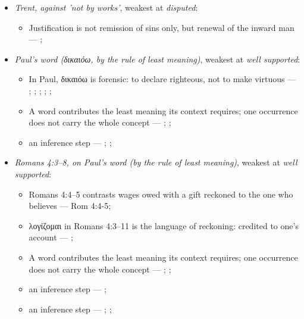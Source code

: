 \documentclass[11pt]{article}
\begin{document}
\begin{itemize}
\item \emph{Trent, against 'not by works'}, weakest at \emph{disputed}:
\begin{itemize}
\item Justification is not remission of sins only, but renewal of the inward man --- \cite[Trent, Session VI (1547), Decree on Justification, ch. 7]{tanner-decrees-1990}; \cite[Trent, Session VI (1547), canon 11]{tanner-decrees-1990}
\end{itemize}
\item \emph{Paul's word (δικαιόω, by the rule of least meaning)}, weakest at \emph{well supported}:
\begin{itemize}
\item In Paul, δικαιόω is forensic: to declare righteous, not to make virtuous --- \cite[s.v. δικαιόω]{bauer-danker-lexicon-2000}; \cite{morris-apostolic-preaching-1965}; \cite[p. 80]{moo-romans-1996}; \cite{irons-righteousness-of-god-2015}; \cite{wright-justification-2009}; \cite[ad loc. Rom 3:24]{fitzmyer-romans-1993}
\item A word contributes the least meaning its context requires; one occurrence does not carry the whole concept --- \cite{silva-biblical-words-1994}; \cite{joos-semantic-axiom-1972}; \cite{barr-semantics-2004}
\item an inference step --- \cite{silva-biblical-words-1994}; \cite[p. 80]{moo-romans-1996}; \cite{barr-semantics-2004}
\end{itemize}
\item \emph{Romans 4:3–8, on Paul's word (by the rule of least meaning)}, weakest at \emph{well supported}:
\begin{itemize}
\item Romans 4:4–5 contrasts wages owed with a gift reckoned to the one who believes --- Rom 4:4-5; \cite[III.xi.18]{calvin-institutes-1960}
\item λογίζομαι in Romans 4:3–11 is the language of reckoning: credited to one's account --- \cite[s.v. λογίζομαι]{bauer-danker-lexicon-2000}; \cite[ad loc. Rom 4:3]{moo-romans-1996}
\item A word contributes the least meaning its context requires; one occurrence does not carry the whole concept --- \cite{silva-biblical-words-1994}; \cite{joos-semantic-axiom-1972}; \cite{barr-semantics-2004}
\item an inference step --- \cite[ad loc. Rom 4:6]{moo-romans-1996}; \cite[s.v. λογίζομαι]{bauer-danker-lexicon-2000}
\item an inference step --- \cite{silva-biblical-words-1994}; \cite[p. 80]{moo-romans-1996}; \cite{barr-semantics-2004}

\end{itemize}
\end{itemize}
\end{document}
